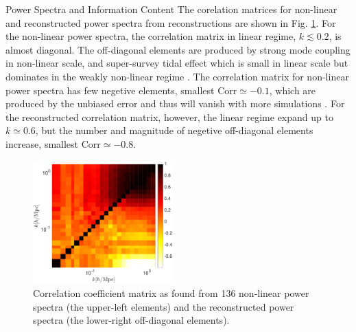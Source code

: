 \begin{section}{Power Spectra and Information Content}
The corelation matrices for non-linear and reconstructed power spectra from
reconstructions are shown in Fig. \ref{fig:corrall}. For the non-linear power spectra, the
correlation matrix in linear regime, $k \lesssim 0.2$, is almost diagonal. The off-diagonal elements are produced by 
strong mode coupling in non-linear scale, and super-survey tidal effect which is small in 
linear scale but dominates in the weakly non-linear regime \cite{bib:Kazuyuki2016}.
The correlation matrix for non-linear power spectra has few negetive elements,
 smallest $\mathrm{Corr} \simeq -0.1$, which are produced by the unbiased error and thus 
 will vanish with more simulations \cite{bib:Takahashi2009}.
 For the reconstructed correlation matrix, however, the linear regime expand up to $k \simeq 0.6$, 
but the number and magnitude of negetive off-diagonal elements increase, smallest $\mathrm{Corr} \simeq -0.8$. 

\begin{figure}
 \centering
  \includegraphics[width=0.48\textwidth]{corrmat_hot-crop.pdf}
  \caption{Correlation coefficient matrix as found from 136 non-linear power spectra 
(the upper-left elements) and the reconstructed power spectra (the lower-right off-diagonal elements).}
    \label{fig:corrall}
\end{figure}



\end{section}
